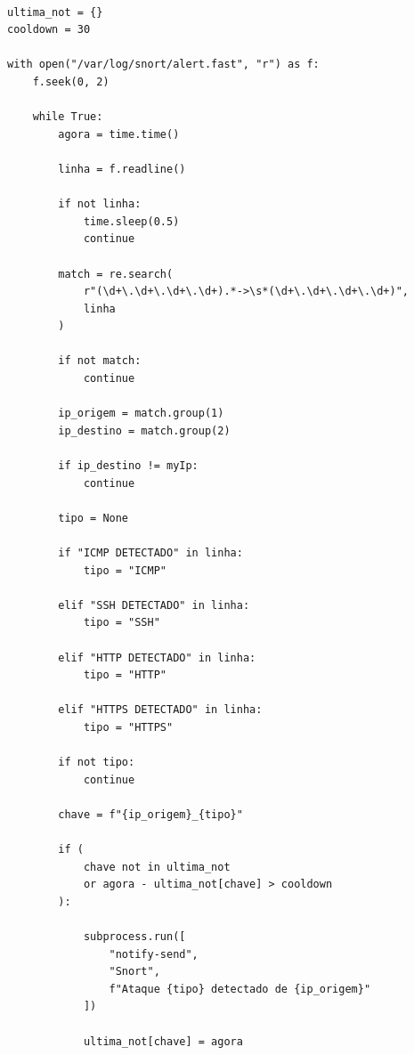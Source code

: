 \begin{listing}[H]
\centering
\begin{verbatim}

ultima_not = {}
cooldown = 30

with open("/var/log/snort/alert.fast", "r") as f:
    f.seek(0, 2)

    while True:
        agora = time.time()

        linha = f.readline()

        if not linha:
            time.sleep(0.5)
            continue

        match = re.search(
            r"(\d+\.\d+\.\d+\.\d+).*->\s*(\d+\.\d+\.\d+\.\d+)",
            linha
        )

        if not match:
            continue

        ip_origem = match.group(1)
        ip_destino = match.group(2)

        if ip_destino != myIp:
            continue

        tipo = None

        if "ICMP DETECTADO" in linha:
            tipo = "ICMP"

        elif "SSH DETECTADO" in linha:
            tipo = "SSH"

        elif "HTTP DETECTADO" in linha:
            tipo = "HTTP"

        elif "HTTPS DETECTADO" in linha:
            tipo = "HTTPS"

        if not tipo:
            continue

        chave = f"{ip_origem}_{tipo}"

        if (
            chave not in ultima_not
            or agora - ultima_not[chave] > cooldown
        ):

            subprocess.run([
                "notify-send",
                "Snort",
                f"Ataque {tipo} detectado de {ip_origem}"
            ])

            ultima_not[chave] = agora
			

\end{verbatim}
\caption{Arquivo monitor.py}
\label{lst:monitor}
\end{listing}

